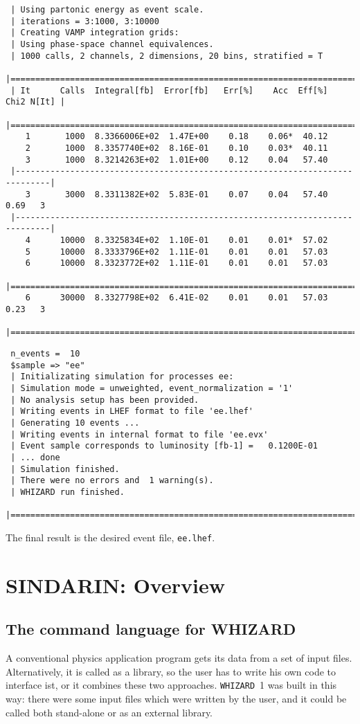 \documentclass[12pt]{book}
\newcommand{\ttt}[1]{\texttt{#1}}
\newcommand{\whizard}{\texttt{WHIZARD}}
\begin{document}
\begin{footnotesize}
 \begin{verbatim}
 | Using partonic energy as event scale.
 | iterations = 3:1000, 3:10000
 | Creating VAMP integration grids:
 | Using phase-space channel equivalences.
 | 1000 calls, 2 channels, 2 dimensions, 20 bins, stratified = T
 |=============================================================================|
 | It      Calls  Integral[fb]  Error[fb]   Err[%]    Acc  Eff[%]   Chi2 N[It] |
 |=============================================================================|
    1       1000  8.3366006E+02  1.47E+00    0.18    0.06*  40.12
    2       1000  8.3357740E+02  8.16E-01    0.10    0.03*  40.11
    3       1000  8.3214263E+02  1.01E+00    0.12    0.04   57.40
 |-----------------------------------------------------------------------------|
    3       3000  8.3311382E+02  5.83E-01    0.07    0.04   57.40    0.69   3
 |-----------------------------------------------------------------------------|
    4      10000  8.3325834E+02  1.10E-01    0.01    0.01*  57.02
    5      10000  8.3333796E+02  1.11E-01    0.01    0.01   57.03
    6      10000  8.3323772E+02  1.11E-01    0.01    0.01   57.03
 |=============================================================================|
    6      30000  8.3327798E+02  6.41E-02    0.01    0.01   57.03    0.23   3
 |=============================================================================|
 \end{verbatim}

 \begin{verbatim}
 n_events =  10
 $sample => "ee"
 | Initializating simulation for processes ee:
 | Simulation mode = unweighted, event_normalization = '1'
 | No analysis setup has been provided.
 | Writing events in LHEF format to file 'ee.lhef'
 | Generating 10 events ...
 | Writing events in internal format to file 'ee.evx'
 | Event sample corresponds to luminosity [fb-1] =   0.1200E-01
 | ... done
 | Simulation finished.
 | There were no errors and  1 warning(s).
 | WHIZARD run finished.
 |=============================================================================|
 \end{verbatim}
 \end{footnotesize}
The final result is the desired event file, \ttt{ee.lhef}.


\chapter{SINDARIN: Overview}

\section{The command language for WHIZARD}
A conventional physics application program gets its data from a set of input
files.  Alternatively, it is called as a library, so the user has to write his
own code to interface ist, or it combines these two approaches.  \whizard~1 was
built in this way: there were some input files which were written by the user,
and it could be called both stand-alone or as an external library.
\end{document}
